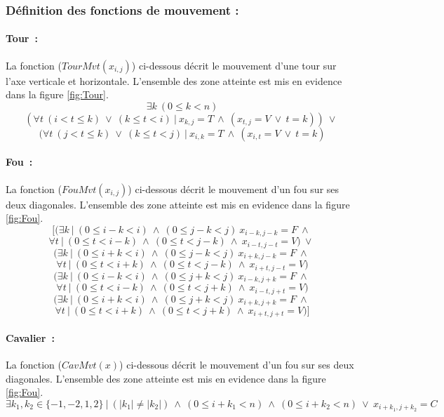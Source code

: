 \documentclass[a4paper,11pt]{article}
\newcommand{\AND}{~\wedge~}
\newcommand{\OR}{~\vee~}
\newcommand{\TQ}{~|~}
\begin{document}
        \subsubsection{Définition des fonctions de mouvement :}
            
          \paragraph{Tour~:} La fonction ($TourMvt(x_{i, j})$) ci-dessous décrit le mouvement d'une tour sur l'axe verticale et horizontale. L'ensemble des zone atteinte est mis en evidence dans la figure \ref{fig:Tour}.
            \[\exists k~(0 \leq k < n) \]
            \[(\forall t~(i < t \leq k) \OR (k \leq t < i) \TQ x_{k, j} = T \AND (x_{t, j} = V \OR t = k)) \OR\]
            \[(\forall t~(j < t \leq k) \OR (k \leq t < j) \TQ x_{i, k} = T \AND (x_{i, t} = V \OR t = k) \]
            
          \paragraph{Fou~:} La fonction ($FouMvt(x_{i, j})$) ci-dessous décrit le mouvement d'un fou sur ses deux diagonales. L'ensemble des zone atteinte est mis en evidence dans la figure \ref{fig:Fou}.
            \[[(\exists k \TQ (0 \leq i-k < i) \AND (0 \leq j-k < j) ~ x_{i-k, j-k} = F \AND \]
            \[\forall t \TQ (0 \leq t < i-k) \AND (0 \leq t < j-k) \AND x_{i-t, j-t} = V ) \OR \]
            \[(\exists k \TQ (0 \leq i+k < i) \AND (0 \leq j-k < j) ~ x_{i+k, j-k} = F \AND \]
            \[\forall t \TQ (0 \leq t < i+k) \AND (0 \leq t < j-k) \AND x_{i+t, j-t} = V )\]
            \[(\exists k \TQ (0 \leq i-k < i) \AND (0 \leq j+k < j) ~ x_{i-k, j+k} = F \AND \]
            \[\forall t \TQ (0 \leq t < i-k) \AND (0 \leq t < j+k) \AND x_{i-t, j+t} = V )\]
            \[(\exists k \TQ (0 \leq i+k < i) \AND (0 \leq j+k < j) ~ x_{i+k, j+k} = F \AND \]
            \[\forall t \TQ (0 \leq t < i+k) \AND (0 \leq t < j+k) \AND x_{i+t, j+t} = V)]\]
            
          \paragraph{Cavalier~:}
             La fonction ($CavMvt(x)$) ci-dessous décrit le mouvement 
             d'un fou sur ses deux diagonales. L'ensemble des zone atteinte est mis en evidence dans la figure \ref{fig:Fou}.
                \[\exists k_{1}, k_{2} \in \{-1, -2, 1, 2\} \TQ (|k_{1}| \neq |k_{2}|) \AND (0 \leq i+k_{1} < n) \AND (0 \leq i+k_{2} < n) \OR x_{i+k_{1}, j+k_{2}} = C\]
                
\end{document}
